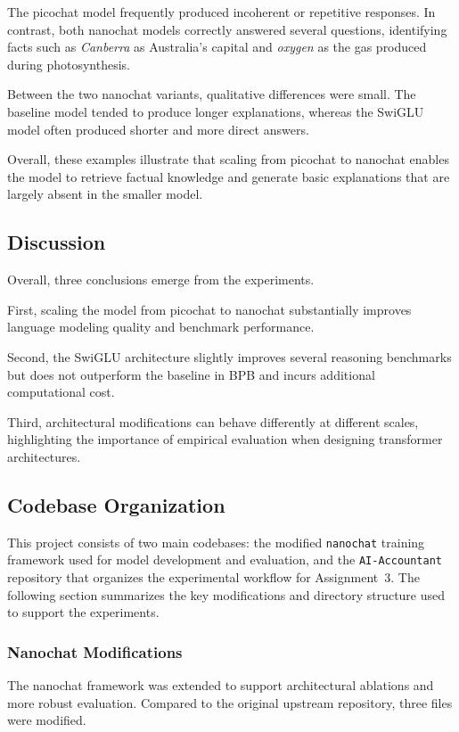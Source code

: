 The picochat model frequently produced incoherent or repetitive
responses. In contrast, both nanochat models correctly answered several
questions, identifying facts such as \textit{Canberra} as Australia's
capital and \textit{oxygen} as the gas produced during photosynthesis.

Between the two nanochat variants, qualitative differences were small.
The baseline model tended to produce longer explanations, whereas the
SwiGLU model often produced shorter and more direct answers.

Overall, these examples illustrate that scaling from picochat to
nanochat enables the model to retrieve factual knowledge and generate
basic explanations that are largely absent in the smaller model.

\subsection{Discussion}

Overall, three conclusions emerge from the experiments.

First, scaling the model from picochat to nanochat substantially improves
language modeling quality and benchmark performance.

Second, the SwiGLU architecture slightly improves several reasoning
benchmarks but does not outperform the baseline in BPB and incurs
additional computational cost.

Third, architectural modifications can behave differently at different
scales, highlighting the importance of empirical evaluation when
designing transformer architectures.

\subsection{Codebase Organization}

This project consists of two main codebases: the modified \texttt{nanochat}
training framework used for model development and evaluation, and the
\texttt{AI-Accountant} repository that organizes the experimental workflow
for Assignment~3. The following section summarizes the key modifications and
directory structure used to support the experiments.

\subsubsection{Nanochat Modifications}

The nanochat framework was extended to support architectural ablations and
more robust evaluation. Compared to the original upstream repository, three
files were modified.

